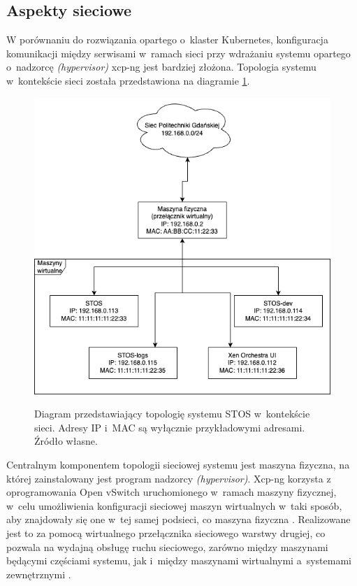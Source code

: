 \subsection{Aspekty sieciowe}
W porównaniu do rozwiązania opartego o~klaster Kubernetes, konfiguracja komunikacji między serwisami w~ramach sieci przy wdrażaniu systemu opartego o~nadzorcę \textit{(hypervisor)} xcp-ng jest bardziej złożona. Topologia systemu w~kontekście sieci została przedstawiona na diagramie \ref{diagramSiecStos}.
\begin{figure}[!h]
	\begin{center}
		\resizebox{0.7\textwidth}{!} {
			\includegraphics{img/4/wdrozeniesiec.png}
		}
		\caption[Topologia sieciowa wdrożonego systemu STOS]{Diagram przedstawiający topologię systemu STOS w~kontekście sieci. Adresy IP i~MAC są wyłącznie przykładowymi adresami. Źródło własne.}
		\label{diagramSiecStos}
	\end{center}
\end{figure}
\noindent Centralnym komponentem topologii sieciowej systemu jest maszyna fizyczna, na której zainstalowany jest program nadzorcy \textit{(hypervisor)}. Xcp-ng korzysta z oprogramowania Open vSwitch uruchomionego w~ramach maszyny fizycznej, w~celu umożliwienia konfiguracji sieciowej maszyn wirtualnych w~taki sposób, aby znajdowały się one w~tej samej podsieci, co maszyna fizyczna \cite{xcpNetwork}. Realizowane jest to za pomocą wirtualnego przełącznika sieciowego warstwy drugiej, co pozwala na wydajną obsługę ruchu sieciowego, zarówno między maszynami będącymi częściami systemu, jak i~między maszynami wirtualnymi a~systemami zewnętrznymi \cite{vswitch}.

